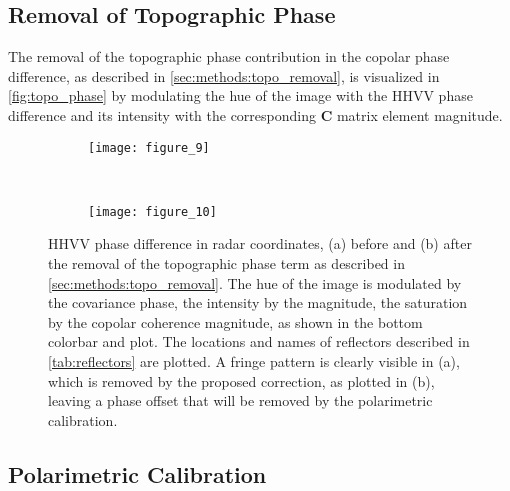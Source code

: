 \subsection{Removal of Topographic Phase}\label{sec:results:topo_removal}
The removal of the topographic phase contribution in the copolar phase difference, as described in \autoref{sec:methods:topo_removal}, is visualized in  \autoref{fig:topo_phase} by modulating the hue of the image with the HHVV phase difference and its intensity with the corresponding $\mathbf{C}$ matrix element magnitude. 
\begin{figure*}[hb]
	\centering
	\begin{subfigure}[t]{0.5\textwidth}
	\centering
	\texttt{[image: figure\_9]}
	\label{fig:topo_phase:uncorrected}
	\end{subfigure}~
	\begin{subfigure}[t]{0.5\textwidth}
	\centering
	\texttt{[image: figure\_10]}
	\label{fig:topo_phase:corrected}
	\end{subfigure}
	\caption{HHVV phase difference in radar coordinates, (a) before and (b)  after the removal of the topographic phase term as described in \autoref{sec:methods:topo_removal}. The hue of the image is modulated by the covariance phase, the intensity by the magnitude, the saturation by the copolar coherence magnitude, as shown in the bottom colorbar and plot. The locations and names of reflectors described in \autoref{tab:reflectors} are plotted. A fringe pattern is clearly visible in (a), which is removed by the proposed correction, as plotted in (b), leaving a phase offset that will be removed by the polarimetric calibration.}
	\label{fig:topo_phase}
\end{figure*}
\subsection{Polarimetric Calibration}\label{sec:results:proc_polcal}

